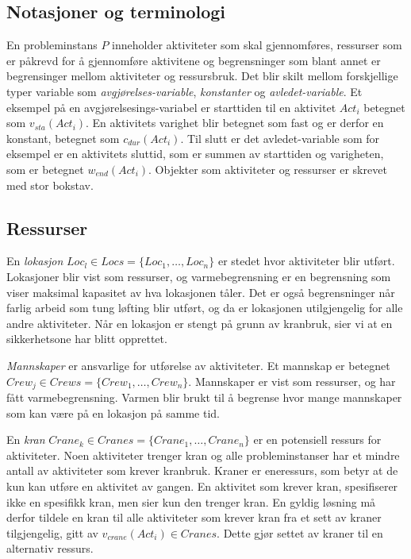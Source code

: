 \subsection{Notasjoner og terminologi}
En probleminstans $ P $ inneholder aktiviteter som skal gjennomføres, ressurser som er påkrevd for å gjennomføre aktivitene og begrensninger som blant annet er begrensinger mellom aktiviteter og ressursbruk. Det blir skilt mellom forskjellige typer variable som \textit{avgjørelses-variable}, \textit{konstanter} og \textit{avledet-variable}. Et eksempel på en avgjørelsesings-variabel er starttiden til en aktivitet $ Act_{i} $ betegnet som $ v_{sta}(Act_{i}) $. En aktivitets varighet blir betegnet som fast og er derfor en konstant, betegnet som $ c_{dur}(Act_{i}) $. Til slutt er det avledet-variable som for eksempel er en aktivitets sluttid, som er summen av starttiden og varigheten, som er betegnet $ w_{end}(Act_{i}) $. Objekter som aktiviteter og ressurser er skrevet med stor bokstav.

\subsection{Ressurser}
En \textit{lokasjon} $ Loc_{l} \in Locs = \{ Loc_{1},\dots,Loc_{n} \} $ er stedet hvor aktiviteter blir utført. Lokasjoner blir vist som ressurser, og varmebegrensning er en begrensning som viser maksimal kapasitet av hva lokasjonen tåler. Det er også begrensninger når farlig arbeid som tung løfting blir utført, og da er lokasjonen utilgjengelig for alle andre aktiviteter. Når en lokasjon er stengt på grunn av kranbruk, sier vi at en sikkerhetsone har blitt opprettet.

\textit{Mannskaper} er ansvarlige for utførelse av aktiviteter. Et mannskap er betegnet $ Crew_{j} \in Crews = \{ Crew_{1},\dots,Crew_{n} \} $. Mannskaper er vist som ressurser, og har fått varmebegrensning. Varmen blir brukt til å begrense hvor mange mannskaper som kan være på en lokasjon på samme tid.

En \textit{kran} $ Crane_{k} \in Cranes = \{ Crane_{1},\dots,Crane_{n} \} $ er en potensiell ressurs for aktiviteter. Noen aktiviteter trenger kran og alle probleminstanser har et mindre antall av aktiviteter som krever kranbruk. Kraner er eneressurs,  som betyr at de kun kan utføre en aktivitet av gangen. En aktivitet som krever kran, spesifiserer ikke en spesifikk kran, men sier kun den trenger kran. En gyldig løsning må derfor tildele en kran til alle aktiviteter som krever kran fra et sett av kraner tilgjengelig, gitt av $ v_{crane}(Act_{i}) \in Cranes $. Dette gjør settet av kraner til en alternativ ressurs.

